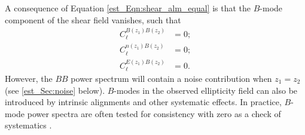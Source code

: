 A consequence of Equation \eqref{est_Eqn:shear_alm_equal} is that the $B$-mode component of the shear field vanishes, such that
\begin{align}
C_\ell^{B \left( z_1 \right) B \left( z_2 \right)} &= 0;
\\[1em]
C_\ell^{n \left( z_1 \right) B \left( z_2 \right)} &= 0;
\\[1em]
C_\ell^{E \left( z_1 \right) B \left( z_2 \right)} &= 0.
\end{align}
However, the $BB$ power spectrum will contain a noise contribution when $z_1 = z_2$ (see \autoref{est_Sec:noise} below). $B$-modes in the observed ellipticity field can also be introduced by intrinsic alignments and other systematic effects. In practice, $B$-mode power spectra are often tested for consistency with zero as a check of systematics \citep[e.g.][]{Asgari2019a}.

